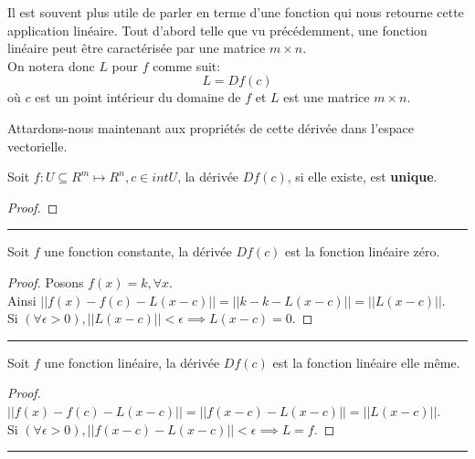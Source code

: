 \documentclass[12pt]{report}
\theoremstyle{definition}
\newenvironment{preuve}{\renewcommand{\proofname}{Preuve}\begin{proof}}{\end{proof}\noindent\textcolor[RGB]{220,220,220}{\rule{\textwidth}{1pt}}}
\begin{document}
    Il est souvent plus utile de parler en terme d'une fonction qui nous retourne 
    cette application linéaire. Tout d'abord telle que vu précédemment, une 
    fonction linéaire peut être caractérisée par une matrice $m \times n$.
    \\
    On notera donc $L$ pour $f$ comme suit:
    $$ L = Df(c) $$
    où $c$ est un point intérieur du domaine de $f$ et $L$ est une matrice $m \times n$.\\
    \pagebreak

    Attardons-nous maintenant aux propriétés de cette dérivée dans l'espace vectorielle.
    \begin{prop}
        \label{thm:unicite_derivee}
        Soit $f: U \subseteq R^m \mapsto R^n, c \in int{U}$, la dérivée $Df(c)$, si elle existe,
        est \textbf{unique}.
    \end{prop}
    \begin{preuve}
    \end{preuve}

    \begin{prop}
        \label{thm:derivee_constante}
        Soit $f$ une fonction constante, la dérivée $Df(c)$ est la fonction
        linéaire zéro.
    \end{prop}
    \begin{preuve}
        Posons $f(x) = k, \forall x$. \\
        Ainsi $||f(x) - f(c) - L(x - c)|| = ||k - k - L(x - c)|| = ||L(x - c)||$. \\
        Si $(\forall \epsilon > 0), ||L(x - c)|| < \epsilon \implies L(x - c) = 0$.
    \end{preuve}

    \begin{prop}
        \label{thm:derivee_constante}
        Soit $f$ une fonction linéaire, la dérivée $Df(c)$ est la fonction
        linéaire elle même.
    \end{prop}
    \begin{preuve}
        $||f(x) - f(c) - L(x - c)|| = ||f(x - c) - L(x - c)|| = ||L(x - c)||$. \\
        Si $(\forall \epsilon > 0), ||f(x - c) - L(x - c)|| < \epsilon \implies L = f$.
    \end{preuve}
\end{document}
